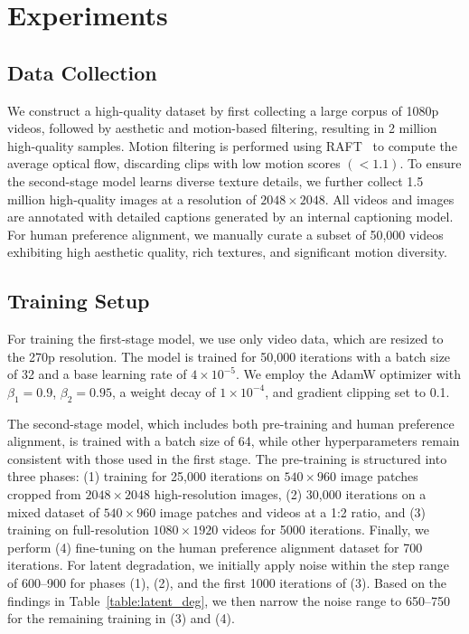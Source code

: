 
\section{Experiments}

\subsection{Data Collection}


We construct a high-quality dataset by first collecting a large corpus of 1080p videos, followed by aesthetic and motion-based filtering, resulting in 2 million high-quality samples. Motion filtering is performed using RAFT~\citep{teed2020raft} to compute the average optical flow, discarding clips with low motion scores \((<1.1)\). To ensure the second-stage model learns diverse texture details, we further collect 1.5 million high-quality images at a resolution of $2048 \times 2048$. All videos and images are annotated with detailed captions generated by an internal captioning model. For human preference alignment, we manually curate a subset of 50,000 videos exhibiting high aesthetic quality, rich textures, and significant motion diversity.

\subsection{Training Setup}
\label{sec:training}


For training the first-stage model, we use only video data, which are resized to the 270p resolution. The model is trained for 50,000 iterations with a batch size of 32 and a base learning rate of $4 \times 10^{-5}$. We employ the AdamW optimizer with $\beta_1 = 0.9$, $\beta_2 = 0.95$, a weight decay of $1 \times 10^{-4}$, and gradient clipping set to 0.1.

\label{exp:optimizer}


The second-stage model, which includes both pre-training and human preference alignment, is trained with a batch size of 64, while other hyperparameters remain consistent with those used in the first stage. The pre-training is structured into three phases: (1) training for 25,000 iterations on $540 \times 960$ image patches cropped from $2048 \times 2048$ high-resolution images, (2) 30,000 iterations on a mixed dataset of $540 \times 960$ image patches and videos at a 1:2 ratio, and (3) training on full-resolution  $1080 \times 1920$ videos for 5000 iterations. Finally, we perform (4) fine-tuning on the human preference alignment dataset for 700 iterations. For latent degradation, we initially apply noise within the step range of 600–900 for phases (1), (2), and the first 1000 iterations of (3). Based on the findings in Table~\ref{table:latent_deg}, we then narrow the noise range to 650–750 for the remaining training in (3) and (4).





